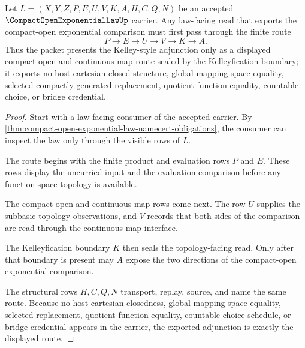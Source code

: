 \begin{theorem}
\label{thm:compact-open-exponential-law-kelley-adjunction}
Let $L=(X,Y,Z,P,E,U,V,K,A,H,C,Q,N)$ be an accepted $\CompactOpenExponentialLawUp$ carrier. Any law-facing read that exports the compact-open exponential comparison must first pass through the finite route
$$
P \longrightarrow E \longrightarrow U \longrightarrow V \longrightarrow K \longrightarrow A .
$$
Thus the packet presents the Kelley-style adjunction only as a displayed compact-open and continuous-map route sealed by the Kelleyfication boundary; it exports no host cartesian-closed structure, global mapping-space equality, selected compactly generated replacement, quotient function equality, countable choice, or bridge credential.
\end{theorem}
\begin{proof}
Start with a law-facing consumer of the accepted carrier. By \autoref{thm:compact-open-exponential-law-namecert-obligations}, the consumer can inspect the law only through the visible rows of $L$.

The route begins with the finite product and evaluation rows $P$ and $E$. These rows display the uncurried input and the evaluation comparison before any function-space topology is available.

The compact-open and continuous-map rows come next. The row $U$ supplies the subbasic topology observations, and $V$ records that both sides of the comparison are read through the continuous-map interface.

The Kelleyfication boundary $K$ then seals the topology-facing read. Only after that boundary is present may $A$ expose the two directions of the compact-open exponential comparison.

The structural rows $H,C,Q,N$ transport, replay, source, and name the same route. Because no host cartesian closedness, global mapping-space equality, selected replacement, quotient function equality, countable-choice schedule, or bridge credential appears in the carrier, the exported adjunction is exactly the displayed route.
\end{proof}


